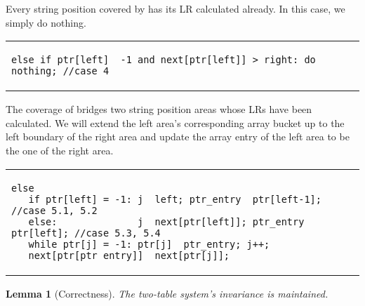 \documentclass[preprint]{elsarticle}
\newtheorem{lemma}{Lemma}[section]
\begin{document}
\smallskip



 Every string position covered by  has
its LR calculated already. In this case, we simply do nothing. 

\smallskip 

\begin{tabular}{l}
{\footnotesize
\begin{lstlisting}
else if ptr[left]  -1 and next[ptr[left]] > right: do nothing; //case 4
\end{lstlisting}
}
\end{tabular}

\smallskip

 The coverage of  bridges two 
string position areas whose LRs have been calculated. 
We will extend the left area's corresponding  array bucket up to
the left boundary of the
right area and update the  array entry of the left area to be the
one of the right area. 

\smallskip

\begin{tabular}{l} 
{\footnotesize
\begin{lstlisting}
else
   if ptr[left] = -1: j  left; ptr_entry  ptr[left-1]; //case 5.1, 5.2
   else:              j  next[ptr[left]]; ptr_entry  ptr[left]; //case 5.3, 5.4
   while ptr[j] = -1: ptr[j]  ptr_entry; j++;
   next[ptr[ptr_entry]]  next[ptr[j]];
\end{lstlisting}
}
\end{tabular}





\smallskip

\begin{lemma}[Correctness]
\label{lem:table-correct}
The two-table system's invariance is maintained.
\end{lemma}
\end{document}
